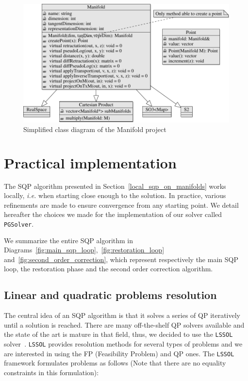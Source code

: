\begin{figure}[htpb]
  \centering
  \includegraphics[width=\linewidth]{uml/manifolds-1.pdf}
  \caption{Simplified class diagram of the Manifold project}
\label{fig:uml_manifold}
\end{figure}

\section{Practical implementation}
\label{sec:practical_implementation}

The SQP algorithm presented in Section~\ref{local_sqp_on_manifolds} works locally, \emph{i.e.} when starting close enough to the solution.
In practice, various refinements are made to ensure convergence from any starting point.
We detail hereafter the choices we made for the implementation of our solver called {\tt PGSolver}.

We summarize the entire SQP algorithm in Diagrams~\ref{fig:main_sqp_loop},~\ref{fig:restoration_loop} and~\ref{fig:second_order_correction}, which represent respectively the main SQP loop, the restoration phase and the second order correction algorithm.

\subsection{Linear and quadratic problems resolution}
\label{sub:linear_and_quadratic_problems_resolution}

The central idea of an SQP algorithm is that it solves a series of QP iteratively until a solution is reached.
There are many off-the-shelf QP solvers available and the state of the art is mature in that field, thus, we decided to use the {\tt LSSOL} solver~\cite{gill:techrep:1986}.
{\tt LSSOL} provides resolution methods for several types of problems and we are interested in using the FP (Feasibility Problem) and QP ones.\@
The {\tt LSSOL} framework formulates problems as follows (Note that there are no equality constraints in this formulation):

